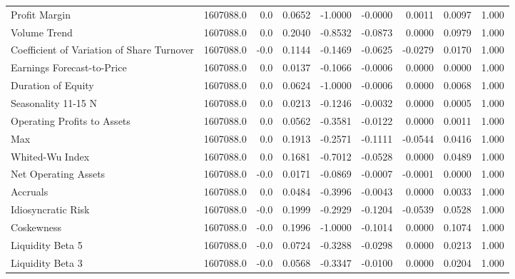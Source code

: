 \begin{tabular}{lrrrrrrrr}
Profit Margin                              &  1607088.0 &   0.0 &  0.0652 & -1.0000 & -0.0000 &  0.0011 &  0.0097 &  1.000 \\
Volume Trend                               &  1607088.0 &   0.0 &  0.2040 & -0.8532 & -0.0873 &  0.0000 &  0.0979 &  1.000 \\
Coefficient of Variation of Share Turnover &  1607088.0 &  -0.0 &  0.1144 & -0.1469 & -0.0625 & -0.0279 &  0.0170 &  1.000 \\
Earnings Forecast-to-Price                 &  1607088.0 &   0.0 &  0.0137 & -0.1066 & -0.0006 &  0.0000 &  0.0000 &  1.000 \\
Duration of Equity                         &  1607088.0 &   0.0 &  0.0624 & -1.0000 & -0.0006 &  0.0000 &  0.0068 &  1.000 \\
Seasonality 11-15 N                        &  1607088.0 &   0.0 &  0.0213 & -0.1246 & -0.0032 &  0.0000 &  0.0005 &  1.000 \\
Operating Profits to Assets                &  1607088.0 &   0.0 &  0.0562 & -0.3581 & -0.0122 &  0.0000 &  0.0011 &  1.000 \\
Max                                        &  1607088.0 &   0.0 &  0.1913 & -0.2571 & -0.1111 & -0.0544 &  0.0416 &  1.000 \\
Whited-Wu Index                            &  1607088.0 &   0.0 &  0.1681 & -0.7012 & -0.0528 &  0.0000 &  0.0489 &  1.000 \\
Net Operating Assets                       &  1607088.0 &  -0.0 &  0.0171 & -0.0869 & -0.0007 & -0.0001 &  0.0000 &  1.000 \\
Accruals                                   &  1607088.0 &   0.0 &  0.0484 & -0.3996 & -0.0043 &  0.0000 &  0.0033 &  1.000 \\
Idiosyncratic Risk                         &  1607088.0 &  -0.0 &  0.1999 & -0.2929 & -0.1204 & -0.0539 &  0.0528 &  1.000 \\
Coskewness                                 &  1607088.0 &  -0.0 &  0.1996 & -1.0000 & -0.1014 &  0.0000 &  0.1074 &  1.000 \\
Liquidity Beta 5                           &  1607088.0 &  -0.0 &  0.0724 & -0.3288 & -0.0298 &  0.0000 &  0.0213 &  1.000 \\
Liquidity Beta 3                           &  1607088.0 &  -0.0 &  0.0568 & -0.3347 & -0.0100 &  0.0000 &  0.0204 &  1.000 \\
\bottomrule
\end{tabular}
